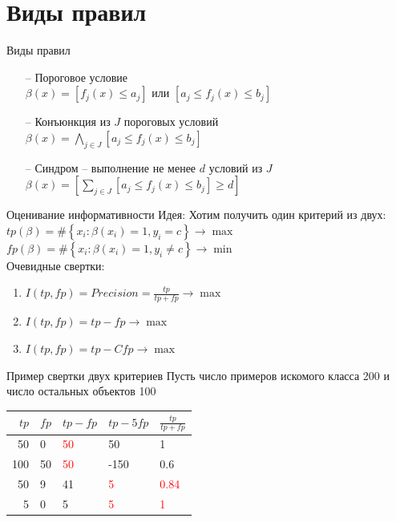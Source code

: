 \documentclass[10pt]{beamer}
\begin{document}
\section{Виды правил}

\begin{frame}{Виды правил}
	\begin{itemize} [<+->]
	\item[--] Пороговое условие\\
	$\beta(x) = \left[f_j(x) \leq a_j \right]$ или  $\left[a_j \leq f_j(x) \leq b_j \right]$
	\item[--] Конъюнкция из $J$ пороговых условий \\
	$\beta(x) = \bigwedge\limits_{j \in J} \left[a_j \leq f_j(x) \leq b_j \right]$
	\item[--] Синдром -- выполнение не менее $d$ условий из $J$
	$\beta(x) = \left[\sum\limits_{j \in J} \left[a_j \leq f_j(x) \leq b_j \right] \geq d \right]$
	\end{itemize}
\end{frame}

\begin{frame}{Оценивание информативности}
	\alert{Идея}: Хотим получить один критерий из двух:\\
	\bigbreak
	${ tp(\beta) = \# \left\{ x_i: \beta(x_i) = 1 , y_i = c \right\} \rightarrow \max  }$ 
	${ fp(\beta) = \# \left\{ x_i: \beta(x_i) = 1 , y_i \neq c \right\} \rightarrow \min}$ \\
	\bigbreak
	\pause
	Очевидные свертки:\\
	\begin{enumerate}
		\item $I(tp, fp) = Precision = \frac{tp}{tp+fp} \rightarrow \max$
		\item $I(tp, fp) = tp-fp \rightarrow \max$
		\item $I(tp, fp) = tp-Cfp \rightarrow \max$			
	\end{enumerate}
\end{frame}

\begin{frame}{Пример свертки двух критериев}
	Пусть число примеров искомого класса 200 и число остальных объектов 100\\
	\bigbreak
	\begin{tabular}{|r l|l|l|l|}
	  \hline 
	  $tp$ & $fp$ & $tp-fp$ & $tp-5fp$ & $\frac{tp}{tp+fp}$\\ 
	  \hline \hline
	  50 & 0 & \textcolor{red}{50} & 50 & 1\\
	  \hline
	  100 & 50 & \textcolor{red}{50} & -150 & 0.6\\
	  \hline \hline
	  50 & 9 & 41 & \textcolor{red}{5} & \textcolor{red}{0.84}\\
	  \hline  
	  5 & 0 & 5 & \textcolor{red}{5} & \textcolor{red}{1}\\  
	  \hline 
	\end{tabular}
\end{frame}
\end{document}
